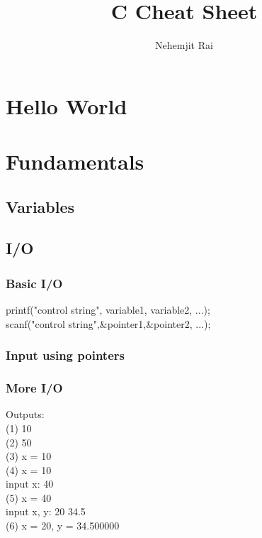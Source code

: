 \documentclass[12pt]{article}
\begin{document}
\title{C Cheat Sheet}
\author{Nehemjit Rai}
\maketitle

\pagebreak 
\tableofcontents
\pagebreak

\section{Hello World}
\begin{mdframed}

\end{mdframed}

\section{Fundamentals}
\subsection{Variables}
\begin{mdframed}

\end{mdframed}

\subsection{I/O}
\subsubsection{Basic I/O}
printf("control string",  variable1,  variable2, ...);\\
scanf("control string",\&pointer1,\&pointer2, ...);
\pagebreak

\subsubsection{Input using pointers}
\begin{mdframed}

\end{mdframed}

\subsubsection{More I/O}
\begin{mdframed}

\end{mdframed}
\pagebreak
Outputs:\\
(1)  10\\
(2)  50\\
(3)  x = 10\\
(4)  x = 10\\
input x: 40\\
(5)  x = 40\\
input x, y: 20 34.5\\
(6)  x = 20, y = 34.500000\\
\end{document}
